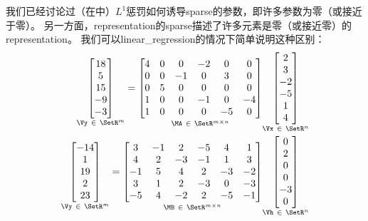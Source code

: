我们已经讨论过（在中）$L^1$惩罚如何诱导\gls{sparse}的参数，即许多参数为零（或接近于零）。
另一方面，\gls{representation}的\gls{sparse}描述了许多元素是零（或接近零）的\gls{representation}。
我们可以\gls{linear_regression}的情况下简单说明这种区别：
\begin{align}
\underset{\Vy ~\in~ \SetR^m}{
 \begin{bmatrix}
  18 \\  5 \\ 15 \\ -9 \\ -3
 \end{bmatrix}} = 
 \underset{\MA ~\in~ \SetR^{m \times n}}{
 \begin{bmatrix}
  4 & 0 & 0 & -2 & 0 & 0 \\
  0 & 0 & -1 & 0 & 3 & 0 \\
  0 & 5 & 0 & 0 & 0 & 0 \\
  1 & 0 & 0 & -1 & 0 & -4 \\
  1 & 0 & 0 & 0 & -5 & 0
 \end{bmatrix}} 
  \underset{\Vx ~\in~ \SetR^n}{
  \begin{bmatrix}
 2 \\ 3\\ -2\\ -5 \\ 1 \\ 4
 \end{bmatrix} }\\
 \underset{\Vy ~\in~ \SetR^m}{
 \begin{bmatrix}
  -14 \\  1 \\ 19 \\  2 \\ 23
 \end{bmatrix}} = 
 \underset{\MB ~\in~ \SetR^{m \times n}}{
 \begin{bmatrix}
  3 & -1 & 2 & -5 & 4 & 1 \\
  4 & 2 & -3 & -1 & 1 & 3 \\
  -1 & 5 & 4 & 2 & -3 & -2 \\
  3 & 1 & 2 & -3 & 0 & -3 \\
  -5 & 4 & -2 & 2 & -5 & -1
 \end{bmatrix}} 
  \underset{\Vh ~\in~ \SetR^n}{
  \begin{bmatrix}
 0 \\ 2 \\ 0 \\ 0 \\ -3 \\ 0
 \end{bmatrix} }
\end{align}

